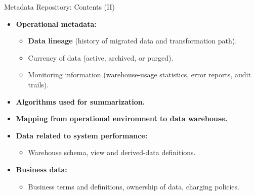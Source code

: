\begin{frame}{Metadata Repository: Contents (II)}
	\begin{itemize}
		\item \textbf{{\color{airforceblue}Operational} metadata:}
		      \begin{itemize}
			      \item \textbf{\color{airforceblue}Data lineage} (history of migrated data and transformation path).
			      \item Currency of data (active, archived, or purged).
			      \item Monitoring information (warehouse-usage statistics, error reports, audit trails).
		      \end{itemize}
		\item \textbf{{\color{airforceblue}Algorithms} used for summarization.}
		\item \textbf{{\color{airforceblue}Mapping} from operational environment to data warehouse.}
		\item \textbf{Data related to system performance:}
		      \begin{itemize}
			      \item Warehouse schema, view and derived-data definitions.
		      \end{itemize}
		\item \textbf{Business data:}
		      \begin{itemize}
			      \item Business terms and definitions, ownership of data, charging policies.
		      \end{itemize}
	\end{itemize}
\end{frame}
